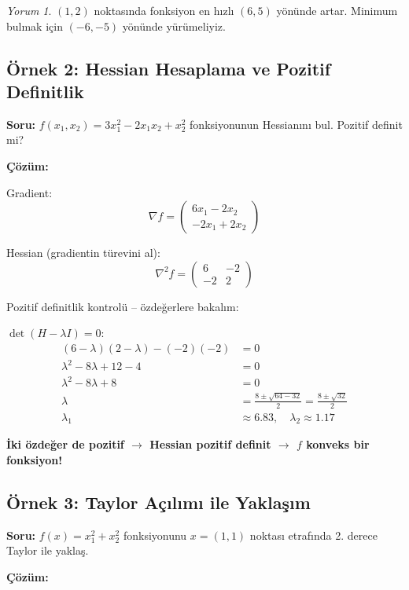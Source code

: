 \documentclass[12pt,a4paper]{article}
\theoremstyle{definition}
\theoremstyle{remark}
\newtheorem*{yorum}{Yorum}
\begin{document}
\begin{yorum}
$(1, 2)$ noktas{\i}nda fonksiyon en h{\i}zl{\i} $(6, 5)$ y\"on\"unde artar. Minimum bulmak i\c{c}in $(-6, -5)$ y\"on\"unde y\"ur\"umeliyiz.
\end{yorum}

\subsection{\"Ornek 2: Hessian Hesaplama ve Pozitif Definitlik}

\textbf{Soru:} $f(x_1, x_2) = 3x_1^2 - 2x_1 x_2 + x_2^2$ fonksiyonunun Hessian{\i}n{\i} bul. Pozitif definit mi?

\textbf{\c{C}\"oz\"um:}

Gradient:
\[
\nabla f = \begin{pmatrix} 6x_1 - 2x_2 \\ -2x_1 + 2x_2 \end{pmatrix}
\]

Hessian (gradientin t\"urevini al):
\[
\nabla^2 f = \begin{pmatrix} 6 & -2 \\ -2 & 2 \end{pmatrix}
\]

Pozitif definitlik kontrol\"u -- \"ozde\u{g}erlere bakal{\i}m:

$\det(H - \lambda I) = 0$:
\begin{align*}
(6-\lambda)(2-\lambda) - (-2)(-2) &= 0 \\
\lambda^2 - 8\lambda + 12 - 4 &= 0 \\
\lambda^2 - 8\lambda + 8 &= 0 \\
\lambda &= \frac{8 \pm \sqrt{64-32}}{2} = \frac{8 \pm \sqrt{32}}{2} \\
\lambda_1 &\approx 6.83, \quad \lambda_2 \approx 1.17
\end{align*}

\textbf{\.{I}ki \"ozde\u{g}er de pozitif $\to$ Hessian pozitif definit $\to$ $f$ konveks bir fonksiyon!}

\subsection{\"Ornek 3: Taylor A\c{c}{\i}l{\i}m{\i} ile Yakla\c{s}{\i}m}

\textbf{Soru:} $f(x) = x_1^2 + x_2^2$ fonksiyonunu $x = (1, 1)$ noktas{\i} etraf{\i}nda 2. derece Taylor ile yakla\c{s}.

\textbf{\c{C}\"oz\"um:}
\end{document}

